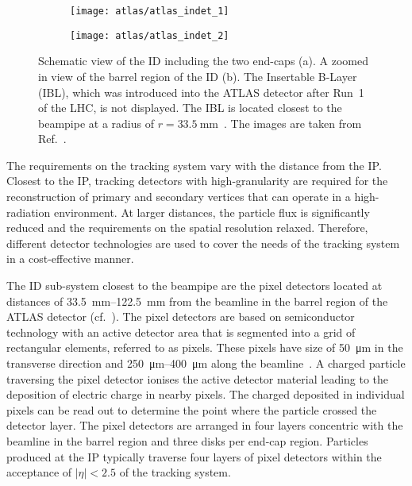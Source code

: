 \begin{figure}[htbp]

  \begin{subfigure}[b]{0.55\textwidth}
    \texttt{[image: atlas/atlas\_indet\_1]}%
    \subcaption{}
  \end{subfigure}\hfill%
  \begin{subfigure}[b]{0.45\textwidth}
    \texttt{[image: atlas/atlas\_indet\_2]}%
    \subcaption{}%
    \label{fig:indet_barrel}
  \end{subfigure}

  \caption{Schematic view of the ID including the two end-caps (a). A zoomed in
    view of the barrel region of the ID (b). The Insertable B-Layer (IBL), which
    was introduced into the ATLAS detector after Run~1 of the LHC, is not
    displayed. The IBL is located closest to the beampipe at a radius of
    $r = \SI{33.5}{\milli\metre}$~\cite{ATLAS-TDR-19,PIX-2018-001}. The images
    are taken from Ref.~\cite{PERF-2007-01}.}%
  \label{fig:atlas_inner_detector}
\end{figure}

The requirements on the tracking system vary with the distance from the IP.
Closest to the IP, tracking detectors with high-granularity are required for the
reconstruction of primary and secondary vertices that can operate in a
high-radiation environment. At larger distances, the particle flux is
significantly reduced and the requirements on the spatial resolution relaxed.
Therefore, different detector technologies are used to cover the needs of the
tracking system in a cost-effective manner.

The ID sub-system closest to the beampipe are the pixel detectors located at
distances of \SIrange{33.5}{122.5}{\milli\metre} from the beamline in the barrel
region of the ATLAS detector (cf.\ ). The pixel
detectors are based on semiconductor technology with an active detector area
that is segmented into a grid of rectangular elements, referred to as
pixels. These pixels have size of \SI{50}{\micro\metre} in the transverse
direction and \SIrange{250}{400}{\micro\metre} along the
beamline~\cite{PERF-2007-01,PIX-2018-001}. A charged particle traversing the
pixel detector ionises the active detector material leading to the deposition of
electric charge in nearby pixels. The charged deposited in individual pixels can
be read out to determine the point where the particle crossed the detector
layer. The pixel detectors are arranged in four layers concentric with the
beamline in the barrel region and three disks per end-cap region. Particles
produced at the IP typically traverse four layers of pixel detectors within the
acceptance of $|\eta| < 2.5$ of the tracking system.

